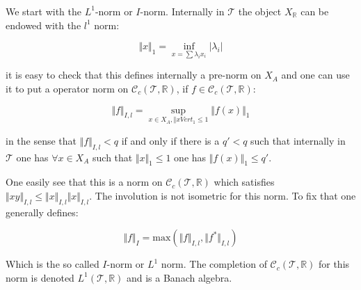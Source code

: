 \documentclass[a4paper]{article}
\newcommand{\R}{\mathbb{R}}
\newcommand{\Tcal}{\mathcal{T}}
\newcommand{\Ccal}{\mathcal{C}}
\newcommand{\block}[1]
{

\par \subsubsection{} #1

\bigskip}
\begin{document}
\block{We start with the $L^1$-norm or $I$-norm. Internally in $\Tcal$ the object $X_\mathbb{R}$ can be endowed with the $l^1$ norm:

\[ \Vert x \Vert_1 = \inf_{x=\sum \lambda_i x_i} |\lambda_i| \]

it is easy to check that this defines internally a pre-norm on $X_A$ and one can use it to put a operator norm on $\Ccal_c(\Tcal,\R)$, if $f \in \Ccal_c(\Tcal,\R)$:

\[ \Vert f \Vert_{I,l} = \sup_{x \in X_A, \Vert x Vert_1 \leqslant 1} \Vert f(x) \Vert_1 \]

in the sense that $\Vert f \Vert_{I,l}<q$ if and only if there is a $q'<q$ such that internally in $\Tcal$ one has $\forall x \in X_A$ such that $\Vert x \Vert_1 \leqslant 1$ one has $\Vert f(x) \Vert_1 \leqslant q'$.

One easily see that this is a norm on $\Ccal_c(\Tcal,\R)$ which satisfies $\Vert x y \Vert_{I,l} \leqslant \Vert x \Vert_{I,l}  \Vert x \Vert_{I,l} $. The involution is not isometric for this norm. To fix that one generally defines:

\[ \Vert f \Vert_I = \text{max} (\Vert f \Vert_{I,l},\Vert f^* \Vert_{I,l}) \]

Which is the so called $I$-norm or $L^1$ norm. The completion of $\Ccal_c(\Tcal,\R)$ for this norm is denoted $L^1(\Tcal,\R)$ and is a Banach algebra.

}
\end{document}
